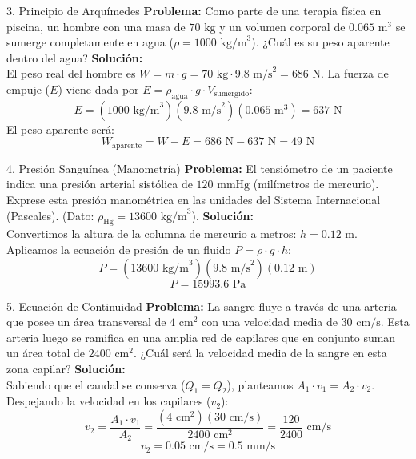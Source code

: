 \documentclass[12pt,letterpaper]{article}
\begin{document}
\vspace{0.3cm}
\begin{infobox}{3. Principio de Arquímedes}
    \textbf{Problema:} Como parte de una terapia física en piscina, un hombre con una masa de $70 \text{ kg}$ y un volumen corporal de $0.065 \text{ m}^3$ se sumerge completamente en agua ($\rho = 1000 \text{ kg/m}^3$). ¿Cuál es su peso aparente dentro del agua?
    \tcblower
    \textbf{Solución:}\\
    El peso real del hombre es $W = m \cdot g = 70 \text{ kg} \cdot 9.8 \text{ m/s}^2 = 686 \text{ N}$. La fuerza de empuje ($E$) viene dada por $E = \rho_{\text{agua}} \cdot g \cdot V_{\text{sumergido}}$:
    \[
    E = (1000 \text{ kg/m}^3)(9.8 \text{ m/s}^2)(0.065 \text{ m}^3) = 637 \text{ N}
    \]
    El peso aparente será:
    \[
    W_{\text{aparente}} = W - E = 686 \text{ N} - 637 \text{ N} = 49 \text{ N}
    \]
\end{infobox}

\vspace{0.3cm}
\begin{infobox}{4. Presión Sanguínea (Manometría)}
    \textbf{Problema:} El tensiómetro de un paciente indica una presión arterial sistólica de $120 \text{ mmHg}$ (milímetros de mercurio). Exprese esta presión manométrica en las unidades del Sistema Internacional (Pascales). (Dato: $\rho_{\text{Hg}} = 13600 \text{ kg/m}^3$).
    \tcblower
    \textbf{Solución:}\\
    Convertimos la altura de la columna de mercurio a metros: $h = 0.12 \text{ m}$. Aplicamos la ecuación de presión de un fluido $P = \rho \cdot g \cdot h$:
    \[
    P = (13600 \text{ kg/m}^3)(9.8 \text{ m/s}^2)(0.12 \text{ m})
    \]
    \[
    P = 15993.6 \text{ Pa}
    \]
\end{infobox}

\vspace{0.3cm}
\begin{infobox}{5. Ecuación de Continuidad}
    \textbf{Problema:} La sangre fluye a través de una arteria que posee un área transversal de $4 \text{ cm}^2$ con una velocidad media de $30 \text{ cm/s}$. Esta arteria luego se ramifica en una amplia red de capilares que en conjunto suman un área total de $2400 \text{ cm}^2$. ¿Cuál será la velocidad media de la sangre en esta zona capilar?
    \tcblower
    \textbf{Solución:}\\
    Sabiendo que el caudal se conserva ($Q_1 = Q_2$), planteamos $A_1 \cdot v_1 = A_2 \cdot v_2$. Despejando la velocidad en los capilares ($v_2$):
    \[
    v_2 = \frac{A_1 \cdot v_1}{A_2} = \frac{(4 \text{ cm}^2)(30 \text{ cm/s})}{2400 \text{ cm}^2} = \frac{120}{2400} \text{ cm/s}
    \]
    \[
    v_2 = 0.05 \text{ cm/s} = 0.5 \text{ mm/s}
    \]
\end{infobox}
\end{document}
